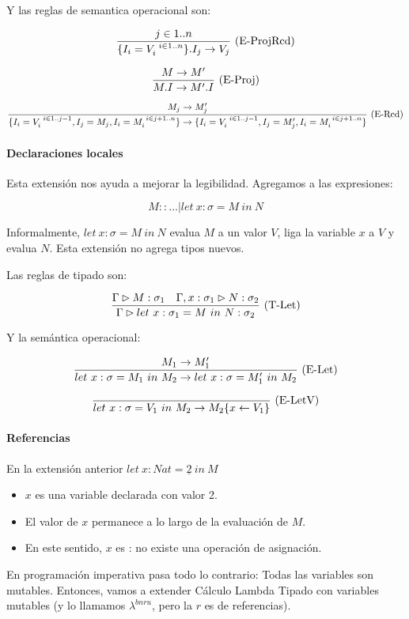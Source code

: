Y las reglas de semantica operacional son:

\[\frac{j \in 1..n}{\{I_i = V_i^{\ i \in 1..n}\}.I_j \to V_j}\ \text{(E-ProjRcd)}\]

\[\frac{M \to M'}{M.I \to M'.I}\ \text{(E-Proj)}\]

\[\deriv{M_j \to M_j'}{\{I_i = V_i^{\ i \in 1..j-1}, I_j = M_j, I_i = M_i^{\ i \in j+1..n}\} \to \{I_i = V_i^{\ i \in 1..j-1}, I_j = M_j', I_i = M_i^{\ i \in j+1..n}\}}{E-Rcd}\]

\paragraph{Declaraciones locales}

Esta extensión nos ayuda a mejorar la legibilidad. Agregamos a las expresiones:

\[M :: \dots \vert let\ x : \sigma = M\ in\ N\]

Informalmente, $let\ x : \sigma = M\ in\ N$ evalua $M$ a un valor $V$, liga la variable $x$ a $V$ y evalua $N$.
Esta extensión no agrega tipos nuevos.

Las reglas de tipado son:

\[\frac{\Gamma \rhd M : \sigma_1\quad \Gamma, x: \sigma_1 \rhd N : \sigma_2}{\Gamma \rhd let\ x : \sigma_1 = M\ in\ N : \sigma_2}\ \text{(T-Let)}\]

Y la semántica operacional:

\[\frac{M_1 \to M_1'}{let\ x : \sigma = M_1\ in\ M_2 \to let\ x : \sigma = M_1'\ in\ M_2}\ \text{(E-Let)}\]

\[\frac{}{let\ x : \sigma = V_1\ in\ M_2 \to M_2\{x \leftarrow V_1\}}\ \text{(E-LetV)}\]

\paragraph{Referencias}

En la extensión anterior $let\ x : Nat = \underline{2}\ in\ M$
\begin{itemize}
  \item $x$ es una variable declarada con valor 2.
  \item El valor de $x$ permanece  a lo largo de la evaluación de $M$.
  \item En este sentido, $x$ es : no existe una operación de asignación.
\end{itemize}

En programación imperativa pasa todo lo contrario: Todas las variables son mutables.
Entonces, vamos a extender Cálculo Lambda Tipado con variables mutables (y lo llamamos $\lambda^{bnru}$, pero la $r$ es de referencias).

